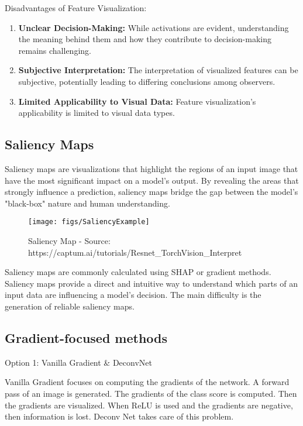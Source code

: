 Disadvantages of Feature Visualization:
\begin{enumerate}
	\item \textbf{Unclear Decision-Making:} While activations are evident, understanding the meaning behind them and how they contribute to decision-making remains challenging.
	\item \textbf{Subjective Interpretation:} The interpretation of visualized features can be subjective, potentially leading to differing conclusions among observers.
	\item \textbf{Limited Applicability to Visual Data:} Feature visualization's applicability is  limited to visual data types.
\end{enumerate}


\subsection{Saliency Maps}

Saliency maps are visualizations that highlight the regions of an input image that have the most significant impact on a model's output. By revealing the areas that strongly influence a prediction, saliency maps bridge the gap between the model's "black-box" nature and human understanding.

\begin{figure}[h!]
	\centering
	\texttt{[image: figs/SaliencyExample]}
	\caption{Saliency Map - Source: https://captum.ai/tutorials/Resnet\_TorchVision\_Interpret}
	\label{fig:saliency}
\end{figure}

Saliency maps are commonly calculated using SHAP \cite{lundberg2017unified} or gradient methods. Saliency maps provide a direct and intuitive way to understand which parts of an input data are influencing a model's decision. The main difficulty is the generation of reliable saliency maps.


\subsection{Gradient-focused methods}
\label{IG}

Option 1: Vanilla Gradient \& DeconvNet

Vanilla Gradient \cite{simonyan2014deep} focuses on computing the gradients of the network.
A forward pass of an image is generated. The gradients of the class score is computed. Then the gradients are visualized. When ReLU is used and the gradients are negative, then information is lost. 
Deconv Net \cite{zeiler2013visualizing} takes care of this problem.


